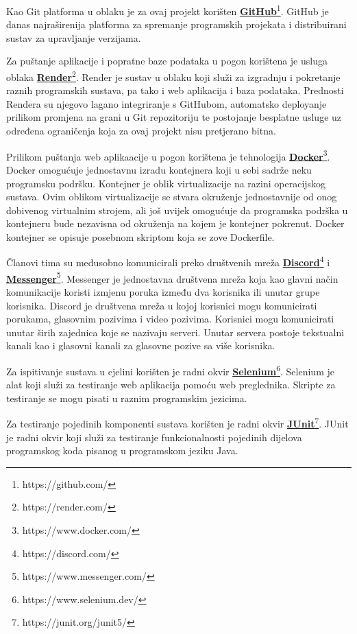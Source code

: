 			Kao Git platforma u oblaku je za ovaj projekt korišten \href{https://github.com/}{\textbf{GitHub}}\footnote{https://github.com/}. GitHub je danas najraširenija platforma za spremanje programskih projekata i distribuirani sustav za upravljanje verzijama.
			
			Za puštanje aplikacije i popratne baze podataka u pogon korištena je usluga oblaka \href{https://render.com/}{\textbf{Render}}\footnote{https://render.com/}. Render je sustav u oblaku koji služi za izgradnju i pokretanje raznih programskih sustava, pa tako i web aplikacija i baza podataka. Prednosti Rendera su njegovo lagano integriranje s GitHubom, automatsko deployanje prilikom promjena na grani u Git repozitoriju te postojanje besplatne usluge uz određena ograničenja koja za ovaj projekt nisu pretjerano bitna.
			
			Prilikom puštanja web aplikaacije u pogon korištena je tehnologija \href{https://www.docker.com/}{\textbf{Docker}}\footnote{https://www.docker.com/}. Docker omogućuje jednostavnu izradu kontejnera koji u sebi sadrže neku programsku podršku. Kontejner je oblik virtualizacije na razini operacijskog sustava. Ovim oblikom virtualizacije se stvara okruženje jednostavnije od onog dobivenog virtualnim strojem, ali još uvijek omogućuje da programska podrška u kontejneru bude nezavisna od okruženja na kojem je kontejner pokrenut. Docker kontejner se opisuje posebnom skriptom koja se zove Dockerfile.  
			
			Članovi tima su međusobno komunicirali preko društvenih mreža \href{https://discord.com/}{\textbf{Discord}}\footnote{https://discord.com/} i \href{https://www.messenger.com/}{\textbf{Messenger}}\footnote{https://www.messenger.com/}. Messenger je jednostavna društvena mreža koja kao glavni način komunikacije koristi izmjenu poruka između dva korisnika ili unutar grupe korisnika. Discord je društvena mreža u kojoj korisnici mogu komunicirati porukama, glasovnim pozivima i video pozivima. Korisnici mogu komunicirati unutar širih zajednica koje se nazivaju serveri. Unutar servera postoje tekstualni kanali kao i glasovni kanali za glasovne pozive sa više korisnika.
			
			Za ispitivanje sustava u cjelini korišten je radni okvir \href{https://www.selenium.dev/}{\textbf{Selenium}}\footnote{https://www.selenium.dev/}. Selenium je alat koji služi za testiranje web aplikacija pomoću web preglednika. Skripte za testiranje se mogu pisati u raznim programskim jezicima. 
			
			Za testiranje pojedinih komponenti sustava korišten je radni okvir \href{https://junit.org/junit5/}{\textbf{JUnit}}\footnote{https://junit.org/junit5/}. JUnit je radni okvir koji služi za testiranje funkcionalnosti pojedinih dijelova programskog koda pisanog u programskom jeziku Java.
			
